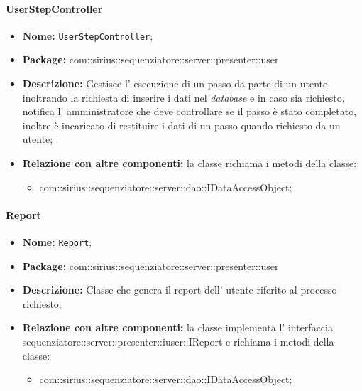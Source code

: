\paragraph{UserStepController}
	\begin{itemize}
		\item \textbf{Nome:} \texttt{UserStepController};
		\item \textbf{Package:} com::sirius::sequenziatore::server::presenter::user
		\item \textbf{Descrizione:} Gestisce l' esecuzione di un passo da parte di un utente inoltrando la richiesta di inserire i dati nel \textit{database} e in caso sia richiesto, notifica l' amministratore che deve controllare se il passo è stato completato, inoltre è incaricato di restituire i dati di un passo quando richiesto da un utente;
		\item \textbf{Relazione con altre componenti:} la classe richiama i metodi della classe:
		\begin{itemize}
			\item com::sirius::sequenziatore::server::dao::IDataAccessObject;
		\end{itemize}
	\end{itemize}
\paragraph{Report}
	\begin{itemize}
		\item \textbf{Nome:} \texttt{Report};
		\item \textbf{Package:} com::sirius::sequenziatore::server::presenter::user
		\item \textbf{Descrizione:} Classe che genera il report dell' utente riferito al processo richiesto;
		\item \textbf{Relazione con altre componenti:} la classe implementa l' interfaccia sequenziatore::server::presenter::iuser::IReport e richiama i metodi della classe:
		\begin{itemize}
			\item com::sirius::sequenziatore::server::dao::IDataAccessObject;
		\end{itemize}
	\end{itemize}
